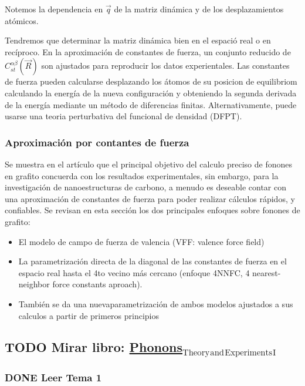 \documentclass[11pt]{article}
\begin{document}
Notemos la dependencia en \(\vec q\) de la matriz dinámica y de los desplazamientos atómicos.

Tendremos que determinar la matriz dinámica bien en el espació real o en recíproco. En la aproximación de constantes de fuerza, un conjunto reducido de \(C^{\alpha\beta}_{st}(\vec R)\) son ajustados para reproducir los datos experientales. Las constantes de fuerza pueden calcularse desplazando los átomos de su posicion de equilibriom calculando la energía de la nueva configuración y obteniendo la segunda derivada de la energía mediante un método de diferencias finitas.
Alternativamente, puede usarse una teoria perturbativa del funcional de densidad (DFPT).

\subsubsection{Aproximación por contantes de fuerza}
\label{sec:orga13e156}

Se muestra en el artículo que el principal objetivo del calculo preciso de fonones en grafito concuerda con los resultados experimentales, sin embargo, para la investigación de nanoestructuras de carbono, a menudo es deseable contar con una aproximación de constantes de fuerza para poder realizar cálculos rápidos, y confiables.
Se revisan en esta sección los dos principales enfoques sobre fonones de grafito:
\begin{itemize}
\item El modelo de campo de fuerza de valencia (VFF: valence force field)
\item La parametrización directa de la diagonal de las constantes de fuerza en el espacio real hasta el 4to vecino más cercano (enfoque 4NNFC, 4 nearest-neighbor force constants aproach).
\item También se da una nuevaparametrización de ambos modelos ajustados a sus calculos a partir de primeros principios
\end{itemize}


\subsection{{\bfseries\sffamily TODO} Mirar libro: \href{Phonons\_Theory\_and\_Experiments\_I.pdf}{Phonons\(_{\text{Theory}}\)\(_{\text{and}}\)\(_{\text{Experiments}}\)\(_{\text{I}}\)}}
\label{sec:orgaad56bc}
\subsubsection{{\bfseries\sffamily DONE} Leer Tema 1}
\label{sec:orga75034d}
\end{document}
